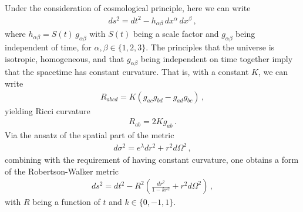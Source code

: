 \documentclass[11pt, onesided]{book}
\theoremstyle{break}
\theoremstyle{break}
\begin{document}
Under the consideration of cosmological principle, here we can write
\begin{align*}
ds^2 =dt^2 -  h_{\alpha\beta}\, dx^\alpha\, dx^\beta\,,
\end{align*}
where $h_{\alpha\beta} = S(t) \, g_{\alpha\beta}$ with $S(t)$ being a scale factor and $g_{\alpha\beta}$ being independent of time, for $\alpha,\beta \in \{1,2,3\}$. The principles that the universe is isotropic, homogeneous, and that $g_{\alpha\beta}$ being independent on time together imply that the spacetime has constant curvature. That is, with a constant $K$, we can write
\begin{align*}
R_{abcd} = K (g_{ac}g_{bd} - g_{ad}g_{bc})\,,
\end{align*}
yielding Ricci curvature
\begin{align*}
R_{ab} = 2K g_{ab}\,.
\end{align*}
Via the ansatz of the spatial part of the metric
\begin{align*}
d\sigma^2 = e^{\lambda} dr^2 + r^2 d\Omega^2\,,
\end{align*}
combining with the requirement of having constant curvature, one obtains a form of the Robertson-Walker metric
\begin{align}
ds^2 = dt^2 - R^2 \left( \frac{dr^2}{1-kr^2} + r^2 d\Omega^2\right)\,,
\end{align}
with $R$ being a function of $t$ and $k \in \{0,-1,1\}$. \\
\end{document}
